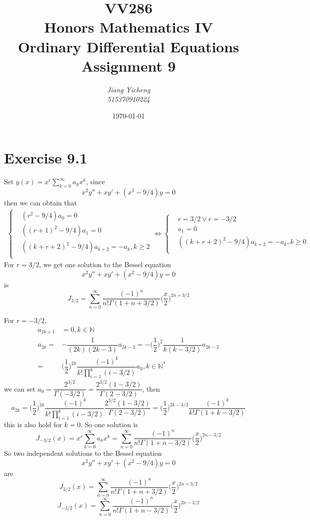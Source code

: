 \documentclass[a4paper,12pt,titlepage]{article}
\author{\textit{Jiang Yicheng}\\\textit{515370910224}}
\title{\textbf{VV286\\ Honors Mathematics IV\\
Ordinary Differential Equations\\
		Assignment 9}}
\date{\today}
\begin{document}
\maketitle

\section*{Exercise 9.1}
Set $y(x)=x^r\sum\limits_{k=0}^{\infty}a_kx^k$, since 
$$x^2y''+xy'+(x^2-9/4)y=0$$
then we can obtain that
\begin{align*}
\left\{
\begin{aligned}
&(r^2-9/4)a_0=0\\
&((r+1)^2-9/4)a_1=0\\
&((k+r+2)^2-9/4)a_{k+2}=-a_k,k\geqslant2\\
\end{aligned}
\right.\Leftrightarrow\left\{
\begin{aligned}
&r=3/2\vee r=-3/2\\
&a_1=0\\
&((k+r+2)^2-9/4)a_{k+2}=-a_k,k\geqslant0\\
\end{aligned}
\right.
\end{align*}
For $r=3/2$, we get one solution to the Bessel equation
$$x^2y''+xy'+(x^2-9/4)y=0$$
is
$$J_{3/2}=\sum\limits_{n=0}^{\infty}\dfrac{(-1)^n}{n!\Gamma(1+n+3/2)}\Big(\dfrac{x}{2}\Big)^{2n+3/2}$$

For $r=-3/2$, 
\begin{align*}
a_{2k+1}&=0,k\in\mathbb{N}\\
a_{2k}=&-\dfrac{1}{(2k)(2k-3)}a_{2k-2}=-\Big(\dfrac{1}{2}\Big)^2\dfrac{1}{k(k-3/2)}a_{2k-2}\\
=&\Big(\dfrac{1}{2}\Big)^{2k}\dfrac{(-1)^k}{k!\prod\limits_{i=1}^k(i-3/2)}a_0,k\in\mathbb{N}^*
\end{align*}
we can set $a_0=\dfrac{2^{3/2}}{\Gamma(-3/2)}=\dfrac{2^{3/2}(1-3/2)}{\Gamma(2-3/2)}$, then 
$$a_{2k}=\Big(\dfrac{1}{2}\Big)^{2k}\dfrac{(-1)^k}{k!\prod\limits_{i=1}^k(i-3/2)}\dfrac{2^{3/2}(1-3/2)}{\Gamma(2-3/2)}=\Big(\dfrac{1}{2}\Big)^{2k-3/2}\dfrac{(-1)^k}{k!\Gamma(1+k-3/2)}$$
this is also hold for $k=0$. So one solution is
$$J_{-3/2}(x)=x^{r}\sum\limits_{k=0}^{\infty}a_{k}x^k=\sum\limits_{n=0}^{\infty}\dfrac{(-1)^n}{n!\Gamma(1+n-3/2)}\Big(\dfrac{x}{2}\Big)^{2n-3/2}$$
So two independent solutions to the Bessel equation
$$x^2y''+xy'+(x^2-9/4)y=0$$
are
$$J_{3/2}(x)=\sum\limits_{n=0}^{\infty}\dfrac{(-1)^n}{n!\Gamma(1+n+3/2)}\Big(\dfrac{x}{2}\Big)^{2n+3/2}$$
$$J_{-3/2}(x)=\sum\limits_{n=0}^{\infty}\dfrac{(-1)^n}{n!\Gamma(1+n-3/2)}\Big(\dfrac{x}{2}\Big)^{2n-3/2}$$
\end{document}
